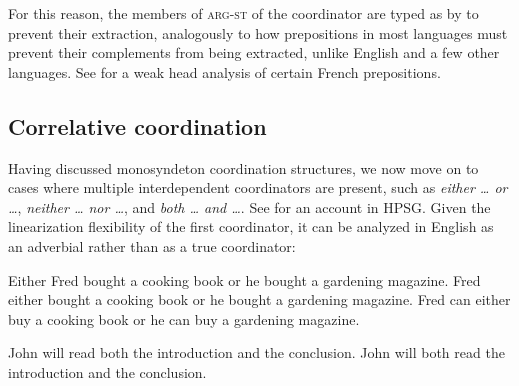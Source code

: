{%



\noindent
For this reason, the members of \textsc{arg-st} of the coordinator are typed as  by \citet[]{Abeille:03} to prevent their extraction, analogously to how prepositions in most languages must prevent their complements from being extracted, unlike English and a few other languages.
See \citet[Section~3.2]{Abeille06} for a weak head analysis of certain French prepositions.




\subsection{Correlative coordination}\label{correlphr}


Having discussed monosyndeton coordination structures, we now move on to cases where
multiple interdependent coordinators are present, such as \emph{either \ldots{} or \ldots{}},
\emph{neither \ldots{} nor \ldots{}}, 
and \emph{both \ldots{} and \ldots{}}. See \citet{hof} for an account  in HPSG. Given the linearization flexibility of the first coordinator, it can be analyzed in English as an adverbial rather than as a true coordinator:

\begin{exe}
 \ex
\begin{xlista}
\ex  Either Fred bought a cooking book or he bought a gardening magazine.
\ex  Fred either bought a cooking book or he bought a gardening magazine.
\ex  Fred can either buy a cooking book or he can buy a gardening magazine.
\end{xlista}
\end{exe}


\begin{exe}
 \ex
\begin{xlista}
\ex John will read both the introduction and the conclusion.
\ex John will both read the introduction and the conclusion.
\end{xlista}
\end{exe}



}
